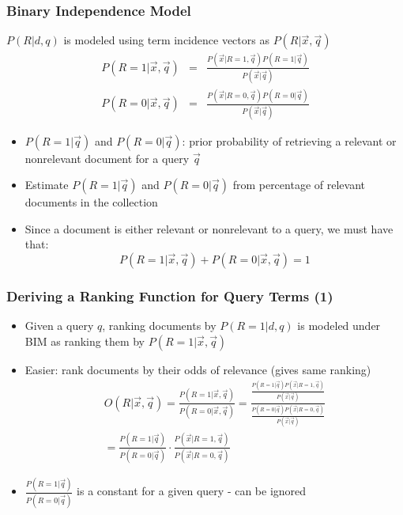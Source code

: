 \documentclass[compress]{beamer}
\begin{document}
\begin{frame}
\frametitle{Binary Independence Model}

$P(R|d,q)$  is modeled using term incidence vectors as $P(R|\vec{x}, \vec{q})$
\begin{eqnarray}
\nonumber
P(R=1|\vec{x}, \vec{q}) &=& \frac{P(\vec{x}|R=1, \vec{q})P(R=1|\vec{q})}{P(\vec{x}|\vec{q})} \label{Rxq-bayes2} \\
P(R=0|\vec{x}, \vec{q}) &=& \frac{P(\vec{x}|R=0, \vec{q})P(R=0|\vec{q})}{P(\vec{x}|\vec{q})} \nonumber
\end{eqnarray}
\begin{itemize}
\pause
\item $P(R=1|\vec{q})$ and $P(R=0|\vec{q})$: prior probability of retrieving a relevant or nonrelevant document for a query $\vec{q}$
\pause
\item Estimate $P(R=1|\vec{q})$ and $P(R=0|\vec{q})$ from percentage of relevant documents in the collection
\pause
\item Since a document is either relevant or nonrelevant to a query, we must have that:
\pause
\begin{equation}
\nonumber
P(R=1|\vec{x}, \vec{q}) + P(R=0|\vec{x},\vec{q}) = 1
\end{equation}
\end{itemize}
\end{frame}
\begin{frame}
\frametitle{Deriving a Ranking Function for Query Terms (1)}
\pause[2]

\begin{itemize}
\item Given a query $q$, ranking documents by $P(R=1|d,q)$ is modeled under BIM as ranking them by $P(R=1|\vec{x},\vec{q})$

\item Easier: rank documents by their odds of relevance (gives same ranking)
\begin{eqnarray}
\nonumber
O(R|\vec{x},\vec{q})
= \frac{P(R=1|\vec{x},\vec{q})}{P(R=0|\vec{x},\vec{q})}
= \frac{\frac{P(R=1|\vec{q})P(\vec{x}|R=1,\vec{q})}{P(\vec{x}|\vec{q})}}{\frac{P(R=0|\vec{q})P(\vec{x}|R=0,\vec{q})}{P(\vec{x}|\vec{q})}}\\
\nonumber
 = \frac{P(R=1|\vec{q})}{P(R=0|\vec{q})}\cdot \frac{P(\vec{x}|R=1,\vec{q})}{P(\vec{x}|R=0,\vec{q})} 
\end{eqnarray}

\item $\frac{P(R=1|\vec{q})}{P(R=0|\vec{q})}$ is a constant for a given query - can be ignored
\end{itemize}
\end{frame}
\end{document}
